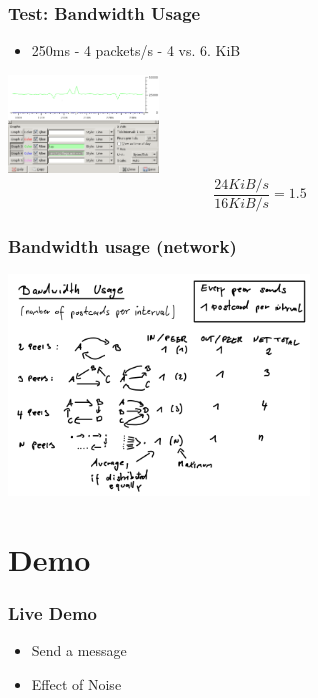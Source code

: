 \documentclass{beamer}
\begin{document}
\frame
{
  \frametitle{Test: Bandwidth Usage}
  \begin{itemize}
          \item 250ms - 4 packets/s - 4 vs. 6. KiB
   \end{itemize}
  \begin{center}
   \includegraphics[width=4cm]{../bandwidth-0250.png}
   $$\frac{24 KiB/s}{16 KiB/s} = 1.5$$
  \end{center}
}

\frame
{
  \frametitle{Bandwidth usage (network)}
  \begin{center}
   \includegraphics[width=8cm]{../bandwidth.png}
  \end{center}
}

\section{Demo}
\frame
{
  \frametitle{Live Demo}
  \begin{itemize}
    \item Send a message
    \item Effect of Noise
  \end{itemize}
}
\end{document}
